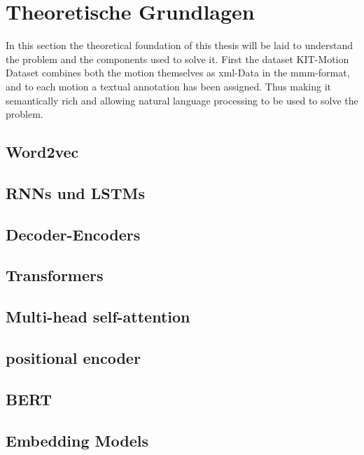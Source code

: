 \chapter{Theoretische Grundlagen}
In this section the theoretical foundation of this thesis will be laid to understand the problem and the components used to solve it. First the dataset KIT-Motion Dataset combines both the motion themselves as xml-Data in the mmm-format, and to each motion a textual annotation has been assigned. Thus making it semantically rich and allowing natural language processing to be used to solve the problem.
\section{Word2vec}
\section{RNNs und LSTMs}
\section{Decoder-Encoders}
\section{Transformers}
\section{Multi-head self-attention}
\section{positional encoder}
\section{BERT}
\section{Embedding Models}
